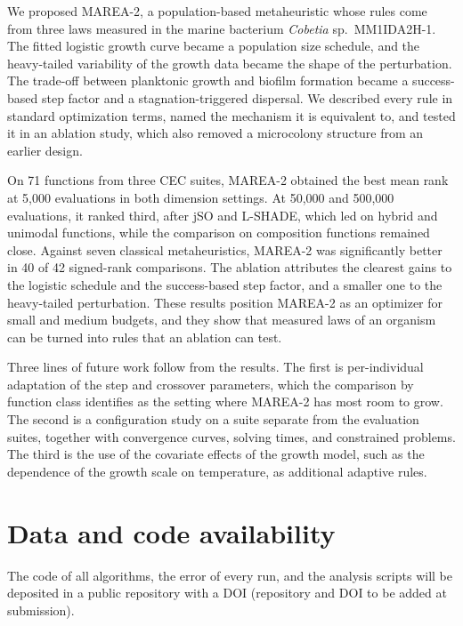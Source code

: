 \documentclass[preprint,12pt]{elsarticle}
\newcommand{\pend}[1]{\textcolor{pending}{#1}}
\newcommand{\pend}[1]{#1}
\begin{document}
We proposed MAREA-2, a population-based metaheuristic whose rules come from
three laws measured in the marine bacterium \emph{Cobetia} sp.\ MM1IDA2H-1. The fitted logistic growth curve became a population size schedule, and the
heavy-tailed variability of the growth data became the shape of the
perturbation. The trade-off between planktonic growth and biofilm formation
became a success-based step factor and a stagnation-triggered dispersal. We described every
rule in standard optimization terms, named the mechanism it is equivalent to,
and tested it in an ablation study, which also removed a microcolony structure
from an earlier design.

On 71 functions from three CEC suites, MAREA-2 obtained the best mean rank at
5,000 evaluations in both dimension settings. At 50,000 and 500,000
evaluations, it ranked third, after jSO and L-SHADE, which led on hybrid and
unimodal functions, while the comparison on composition functions remained
close. Against seven classical metaheuristics, MAREA-2 was significantly better
in 40 of 42 signed-rank comparisons. The ablation attributes the clearest
gains to the logistic schedule and the success-based step factor, and a
smaller one to the heavy-tailed perturbation. These results position MAREA-2 as
an optimizer for small and medium budgets, and they show that measured laws of
an organism can be turned into rules that an ablation can test.

Three lines of future work follow from the results. The first is
per-individual adaptation of the step and crossover parameters, which the
comparison by function class identifies as the setting where MAREA-2 has most
room to grow. The second is a configuration study on a suite separate from the
evaluation suites, together with convergence curves, solving times, and
constrained problems. The third is the use of the covariate effects of the
growth model, such as the dependence of the growth scale on temperature, as
additional adaptive rules.

\section*{Data and code availability}

The code of all algorithms, the error of every run, and the analysis scripts
will be deposited in a public repository with a DOI
\pend{(repository and DOI to be added at submission)}.



\end{document}
